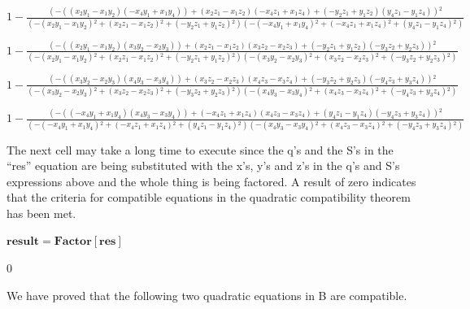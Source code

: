 \documentclass{article}
\begin{document}
\begin{doublespace}
\noindent\(1-\frac{\left(-\left(\left(x_2 y_1-x_1 y_2\right) \left(-x_4 y_1+x_1 y_4\right)\right)+\left(x_2 z_1-x_1 z_2\right) \left(-x_4 z_1+x_1
z_4\right)+\left(-y_2 z_1+y_1 z_2\right) \left(y_4 z_1-y_1 z_4\right)\right){}^2}{\left(-\left(x_2 y_1-x_1 y_2\right){}^2+\left(x_2 z_1-x_1 z_2\right){}^2+\left(-y_2
z_1+y_1 z_2\right){}^2\right) \left(-\left(-x_4 y_1+x_1 y_4\right){}^2+\left(-x_4 z_1+x_1 z_4\right){}^2+\left(y_4 z_1-y_1 z_4\right){}^2\right)}\)
\end{doublespace}

\begin{doublespace}
\noindent\(1-\frac{\left(-\left(\left(x_2 y_1-x_1 y_2\right) \left(x_3 y_2-x_2 y_3\right)\right)+\left(x_2 z_1-x_1 z_2\right) \left(x_3 z_2-x_2 z_3\right)+\left(-y_2
z_1+y_1 z_2\right) \left(-y_3 z_2+y_2 z_3\right)\right){}^2}{\left(-\left(x_2 y_1-x_1 y_2\right){}^2+\left(x_2 z_1-x_1 z_2\right){}^2+\left(-y_2
z_1+y_1 z_2\right){}^2\right) \left(-\left(x_3 y_2-x_2 y_3\right){}^2+\left(x_3 z_2-x_2 z_3\right){}^2+\left(-y_3 z_2+y_2 z_3\right){}^2\right)}\)
\end{doublespace}

\begin{doublespace}
\noindent\(1-\frac{\left(-\left(\left(x_3 y_2-x_2 y_3\right) \left(x_4 y_3-x_3 y_4\right)\right)+\left(x_3 z_2-x_2 z_3\right) \left(x_4 z_3-x_3 z_4\right)+\left(-y_3
z_2+y_2 z_3\right) \left(-y_4 z_3+y_3 z_4\right)\right){}^2}{\left(-\left(x_3 y_2-x_2 y_3\right){}^2+\left(x_3 z_2-x_2 z_3\right){}^2+\left(-y_3
z_2+y_2 z_3\right){}^2\right) \left(-\left(x_4 y_3-x_3 y_4\right){}^2+\left(x_4 z_3-x_3 z_4\right){}^2+\left(-y_4 z_3+y_3 z_4\right){}^2\right)}\)
\end{doublespace}

\begin{doublespace}
\noindent\(1-\frac{\left(-\left(\left(-x_4 y_1+x_1 y_4\right) \left(x_4 y_3-x_3 y_4\right)\right)+\left(-x_4 z_1+x_1 z_4\right) \left(x_4 z_3-x_3
z_4\right)+\left(y_4 z_1-y_1 z_4\right) \left(-y_4 z_3+y_3 z_4\right)\right){}^2}{\left(-\left(-x_4 y_1+x_1 y_4\right){}^2+\left(-x_4 z_1+x_1 z_4\right){}^2+\left(y_4
z_1-y_1 z_4\right){}^2\right) \left(-\left(x_4 y_3-x_3 y_4\right){}^2+\left(x_4 z_3-x_3 z_4\right){}^2+\left(-y_4 z_3+y_3 z_4\right){}^2\right)}\)
\end{doublespace}

The next cell may take a long time to execute since the q{'}s and the S{'}s in the {``}res{''} equation are being substituted with the x{'}s, y{'}s
and z{'}s in the q{'}s and S{'}s expressions above and the whole thing is being factored. A result of zero indicates that the criteria for compatible
equations in the quadratic compatibility theorem has been met.

\begin{doublespace}
\noindent\(\pmb{\text{result} = \text{Factor}[\text{res}]}\)
\end{doublespace}

\begin{doublespace}
\noindent\(0\)
\end{doublespace}

We have proved that the following two quadratic equations in B are compatible.
\end{document}
